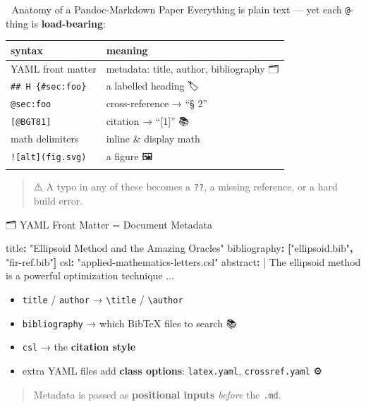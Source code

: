 \documentclass[
  10pt,
  ignorenonframetext,
  serif,
  aspectratio=169]{beamer}
\newenvironment{Shaded}{}{}
\newcommand{\AttributeTok}[1]{\textcolor[rgb]{0.49,0.56,0.16}{#1}}
\newcommand{\CharTok}[1]{\textcolor[rgb]{0.25,0.44,0.63}{#1}}
\newcommand{\FunctionTok}[1]{\textcolor[rgb]{0.02,0.16,0.49}{#1}}
\newcommand{\KeywordTok}[1]{\textcolor[rgb]{0.00,0.44,0.13}{\textbf{#1}}}
\newcommand{\NormalTok}[1]{#1}
\newcommand{\StringTok}[1]{\textcolor[rgb]{0.25,0.44,0.63}{#1}}
\newcounter{none} %
\providecommand{\tightlist}{%
  \setlength{\itemsep}{0pt}\setlength{\parskip}{0pt}}
\begin{document}
\begin{frame}[fragile]{🧬 Anatomy of a Pandoc-Markdown Paper}
\protect{}\label{anatomy-of-a-pandoc-markdown-paper}
Everything is plain text --- yet each \texttt{@}-thing is
\textbf{load-bearing}:

{\def\LTcaptype{none} %
\begin{longtable}[]{@{}ll@{}}
\toprule\noalign{}
syntax & meaning \\
\midrule\noalign{}
\endhead
YAML front matter & metadata: title, author, bibliography 🗂️ \\
\texttt{\#\#\ H\ \{\#sec:foo\}} & a labelled heading 🏷️ \\
\texttt{@sec:foo} & cross-reference → ``§ 2'' 🔗 \\
\texttt{{[}@BGT81{]}} & citation → ``{[}1{]}'' 📚 \\
math delimiters & inline \& display math 📐 \\
\texttt{!{[}alt{]}(fig.svg)} & a figure 🖼️ \\
\bottomrule\noalign{}
\end{longtable}
}

\begin{quote}
⚠️ A typo in any of these becomes a \texttt{??}, a missing reference, or
a hard build error.
\end{quote}
\end{frame}

\begin{frame}[fragile]{🗂️ YAML Front Matter = Document Metadata}
\protect{}\label{yaml-front-matter-document-metadata}
\begin{Shaded}
\begin{Highlighting}[]
\FunctionTok{title}\KeywordTok{:}\AttributeTok{ }\StringTok{"Ellipsoid Method and the Amazing Oracles"}
\FunctionTok{bibliography}\KeywordTok{:}\AttributeTok{ }\KeywordTok{[}\StringTok{"ellipsoid.bib"}\KeywordTok{,}\AttributeTok{ }\StringTok{"fir{-}ref.bib"}\KeywordTok{]}
\FunctionTok{csl}\KeywordTok{:}\AttributeTok{ }\StringTok{"applied{-}mathematics{-}letters.csl"}
\FunctionTok{abstract}\KeywordTok{: }\CharTok{|}
\NormalTok{  The ellipsoid method is a powerful optimization technique ...}
\end{Highlighting}
\end{Shaded}

\begin{itemize}
\tightlist
\item
  \texttt{title} / \texttt{author} → \texttt{\textbackslash{}title} /
  \texttt{\textbackslash{}author} 📕
\item
  \texttt{bibliography} → which BibTeX files to search 📚
\item
  \texttt{csl} → the \textbf{citation style} 🎨
\item
  extra YAML files add \textbf{class options}: \texttt{latex.yaml},
  \texttt{crossref.yaml} ⚙️
\end{itemize}

\begin{quote}
Metadata is passed as \textbf{positional inputs} \emph{before} the
\texttt{.md}. 🧩
\end{quote}
\end{frame}
\end{document}

